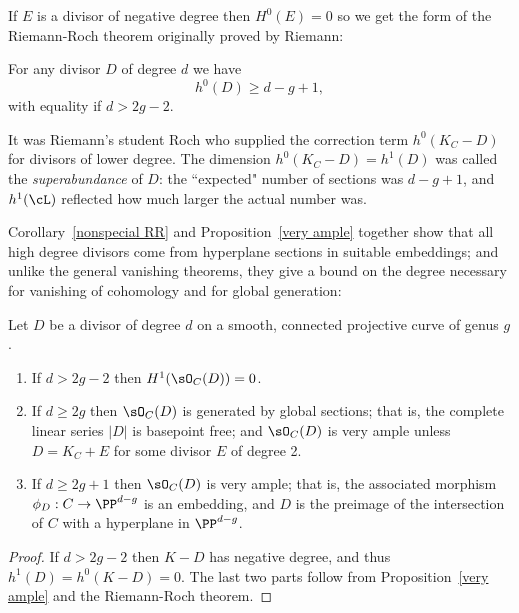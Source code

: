 If $E$ is a divisor of negative degree then $H^0(E) = 0$ so we get the form of the Riemann-Roch theorem
originally proved by Riemann:

\begin{corollary}\label{nonspecial RR}
For any divisor $D$ of degree $d$ we have
$$
h^0(D) \geq d - g + 1,
$$
with equality if $d > 2g-2$.
\end{corollary}
It was Riemann's student Roch  who supplied the correction term $h^0(K_C - D)$ for divisors of lower degree.
The dimension $h^0(K_C-D) = h^1(D)$ was called the \emph{superabundance} of $D$: the ``expected" number of sections was $d-g+1$, and $h^1(\cL)$ reflected how much larger the actual number was.

Corollary~\ref{nonspecial RR} and Proposition~\ref{very ample} together show that all high degree divisors come from hyperplane sections in 
suitable embeddings; and unlike the general vanishing theorems, they give a bound on the degree necessary for vanishing
of cohomology and for
global generation:

\begin{corollary}\label{degree 2g+1 embedding}
Let $D$ be a divisor of degree $d$ on a smooth, connected projective curve of genus $g$.
\begin{enumerate}
 \item If $d>2g-2$ then $H^1(\sO_C(D)) = 0$.
 \item If $d \geq 2g$ then $\sO_C(D)$ is generated by global sections; that is, the complete linear series $|D|$ is basepoint free; and $\sO_C(D)$ is very ample unless $D = K_{C}+E$ for some divisor $E$ of degree 2.
 \item If $d \geq 2g+1$ then $\sO_C(D)$ is very ample; that is, the associated morphism $\phi_D : C \to \PP^{d-g}$ is an embedding, and
$D$ is the preimage of the intersection of $C$ with a hyperplane in $ \PP^{d-g}$.
\end{enumerate}
\end{corollary}

\begin{proof}
If $d>2g-2$ then $K-D$ has negative degree, and thus $h^1(D) = h^0(K-D) = 0.$ The last two parts follow
from Proposition~\ref{very ample} and the Riemann-Roch theorem.
\end{proof}

